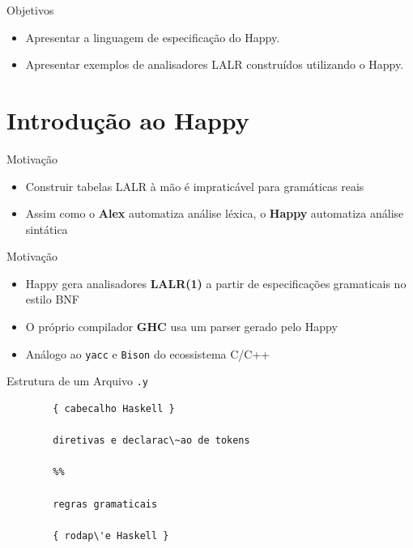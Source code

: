 \subtitle{\bf Aula 11 - Introdução}
\begin{frame}[t,plain]
    \titlepage
\end{frame}

\begin{frame}{Objetivos}

    \begin{itemize}
        \item
        Apresentar a linguagem de especificação do Happy.
        \item
        Apresentar exemplos de analisadores LALR construídos utilizando o
        Happy.
    \end{itemize}
\end{frame}


\section{Introdução ao Happy}\label{introduuxe7uxe3o-ao-happy}

\begin{frame}{Motivação}

    \begin{itemize}

        \item
        Construir tabelas LALR à mão é impraticável para gramáticas reais
        \item
        Assim como o \textbf{Alex} automatiza análise léxica, o \textbf{Happy}
        automatiza análise sintática
    \end{itemize}
\end{frame}

\begin{frame}[fragile]{Motivação}

    \begin{itemize}

        \item
        Happy gera analisadores \textbf{LALR(1)} a partir de especificações
        gramaticais no estilo BNF
        \item
        O próprio compilador \textbf{GHC} usa um parser gerado pelo Happy
        \item
        Análogo ao \texttt{yacc} e
        \texttt{Bison} do ecossistema C/C++
    \end{itemize}
\end{frame}

\begin{frame}[fragile]{Estrutura de um Arquivo
    \texttt{.y}}

    \begin{lstlisting}
        { cabecalho Haskell }

        diretivas e declarac\~ao de tokens

        %%

        regras gramaticais

        { rodap\'e Haskell }
    \end{lstlisting}
\end{frame}

